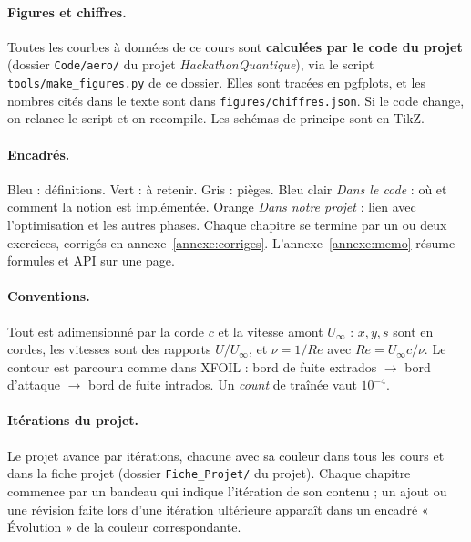 \documentclass[11pt,a4paper]{report}
\renewcommand{\Re}{\mathit{Re}}
\begin{document}
\paragraph{Figures et chiffres.} Toutes les courbes à données de ce cours sont \textbf{calculées par le code du projet} (dossier \texttt{Code/aero/} du projet \emph{HackathonQuantique}), via le script \texttt{tools/make\_figures.py} de ce dossier. Elles sont tracées en pgfplots, et les nombres cités dans le texte sont dans \texttt{figures/chiffres.json}. Si le code change, on relance le script et on recompile. Les schémas de principe sont en TikZ.

\paragraph{Encadrés.} Bleu : définitions. Vert : à retenir. Gris : pièges. Bleu clair \emph{Dans le code} : où et comment la notion est implémentée. Orange \emph{Dans notre projet} : lien avec l'optimisation et les autres phases. Chaque chapitre se termine par un ou deux exercices, corrigés en annexe~\ref{annexe:corriges}. L'annexe~\ref{annexe:memo} résume formules et API sur une page.

\paragraph{Conventions.} Tout est adimensionné par la corde $c$ et la vitesse amont $U_\infty$ : $x,y,s$ sont en cordes, les vitesses sont des rapports $U/U_\infty$, et $\nu=1/\Re$ avec $\Re=U_\infty c/\nu$. Le contour est parcouru comme dans XFOIL : bord de fuite extrados $\to$ bord d'attaque $\to$ bord de fuite intrados. Un \emph{count} de traînée vaut $10^{-4}$.

\paragraph{Itérations du projet.} Le projet avance par itérations, chacune avec sa couleur dans tous les cours et dans la fiche projet (dossier \texttt{Fiche\_Projet/} du projet). Chaque chapitre commence par un bandeau qui indique l'itération de son contenu ; un ajout ou une révision faite lors d'une itération ultérieure apparaît dans un encadré « Évolution » de la couleur correspondante.
\legendeiterations

\tableofcontents
\cleardoublepage
{}
















\appendix



\end{document}
